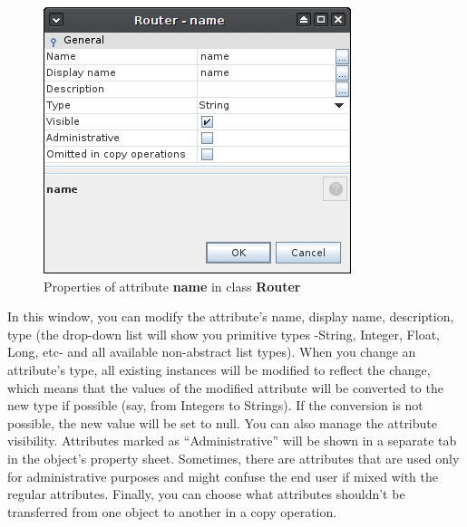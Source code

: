 \documentclass[a4paper]{article}
\begin{document}
\begin{itemize}
			\begin{figure}[h!]
				\centering
				\includegraphics[width=0.4\linewidth]{img/class_attribute_details.png}
				\caption{Properties of attribute \textbf{name} in class \textbf{Router}}
				\label{fig:class_attribute_details}
			\end{figure}
		\end{itemize}
		In this window, you can modify the attribute's name, display name, description, type  (the drop-down list will show you primitive types -String, Integer, Float, Long, etc- and all available non-abstract list types). When you change an attribute's type, all existing instances will be	modified to reflect the change, which means that the values of the modified attribute will be converted to the new type if possible (say, from Integers to Strings). If the conversion is not possible, the new value will be set to null. You  can  also  manage  the  attribute  visibility. Attributes marked as “Administrative” will be shown in a separate tab in the object's property sheet. Sometimes, there are  attributes that are used only for administrative purposes and might confuse the end user if mixed with the regular attributes. Finally, you can choose what attributes shouldn't be transferred from one object to another in a copy operation.
		
\end{document}
